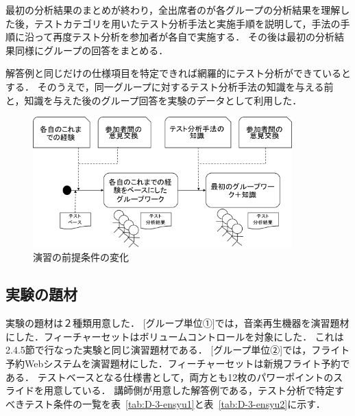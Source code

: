 最初の分析結果のまとめが終わり，全出席者のが各グループの分析結果を理解した後，テストカテゴリを用いたテスト分析手法と実施手順を説明して，手法の手順に沿って再度テスト分析を参加者が各自で実施する．
その後は最初の分析結果同様にグループの回答をまとめる．

解答例と同じだけの仕様項目を特定できれば網羅的にテスト分析ができているとする．
そのうえで，同一グループに対するテスト分析手法の知識を与える前と，知識を与えた後のグループ回答を実験のデータとして利用した．
\begin{figure}[h]
\begin{center}
\includegraphics[width=10cm]{./image/D-3-ExparimentAbst1.png}
\caption{演習の前提条件の変化}
\label{fig:D-3-ExparimentAbst1}
\end{center}
\end{figure}

\subsection{実験の題材}
実験の題材は２種類用意した．
[グループ単位①]では，音楽再生機器を演習題材にした．フィーチャーセットはボリュームコントロールを対象にした．
これは2.4.5節で行なった実験と同じ演習題材である．
[グループ単位②]では，フライト予約Webシステムを演習題材にした．フィーチャーセットは新規フライト予約である．
テストベースとなる仕様書として，両方とも12枚のパワーポイントのスライドを用意している．
講師側が用意した解答例である，テスト分析で特定すべきテスト条件の一覧を表~\ref{tab:D-3-ensyu1}と表~\ref{tab:D-3-ensyu2}に示す．

